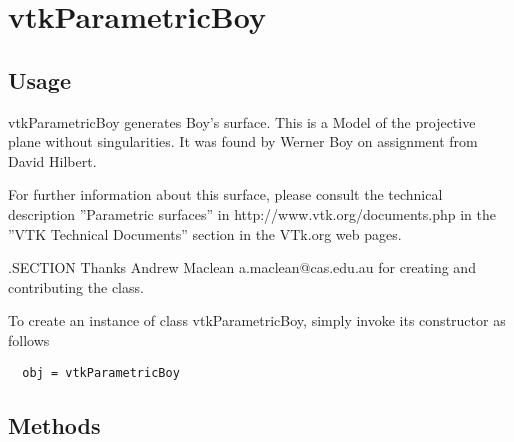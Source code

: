 \section{vtkParametricBoy}

\subsection{Usage}

 vtkParametricBoy generates Boy's surface.
 This is a Model of the projective plane without singularities.
 It was found by Werner Boy on assignment from David Hilbert.

 For further information about this surface, please consult the 
 technical description ''Parametric surfaces'' in http://www.vtk.org/documents.php 
 in the ''VTK Technical Documents'' section in the VTk.org web pages.

 .SECTION Thanks
 Andrew Maclean a.maclean@cas.edu.au for 
 creating and contributing the class.


To create an instance of class vtkParametricBoy, simply
invoke its constructor as follows
\begin{verbatim}
  obj = vtkParametricBoy
\end{verbatim}
\subsection{Methods}

